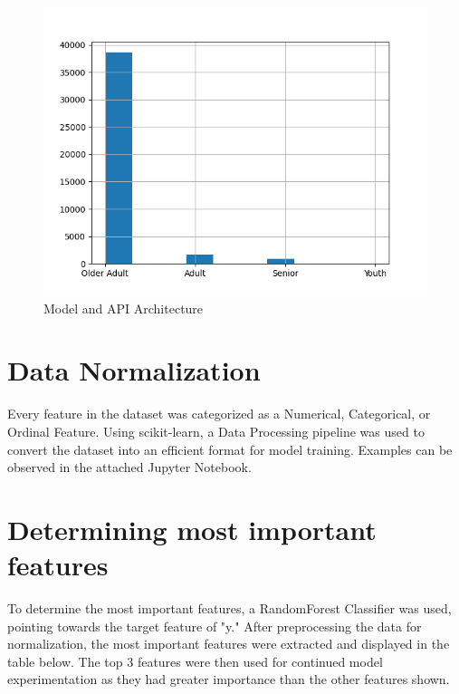 \documentclass{article}
\begin{document}
\begin{figure}[H]
    \centering
    \includegraphics[width=0.75\linewidth]{paper/age_groups.png}
    \caption{Model and API Architecture}
    \label{fig:enter-label}
\end{figure}

\section{Data Normalization}

Every feature in the dataset was categorized as a Numerical, Categorical, or Ordinal Feature. Using scikit-learn, a Data Processing pipeline was used to convert the dataset into an efficient format for model training. Examples can be observed in the attached Jupyter Notebook.



\section{Determining most important features}

To determine the most important features, a RandomForest Classifier was used, pointing towards the target feature of "y." After preprocessing the data for normalization, the most important features were extracted and displayed in the table below. The top 3 features were then used for continued model experimentation as they had greater importance than the other features shown.
\end{document}

